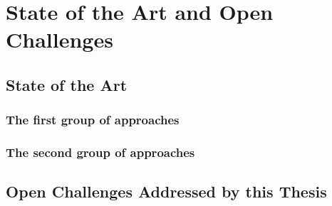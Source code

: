 
\chapter{State of the Art and Open Challenges}

\section{State of the Art}

\blindtext


\subsection*{The first group of approaches}
\label{subsec_FirstGroupRelated}
\blindtext
\cite{AspectJ}

\subsection*{The second group of approaches}
\label{subsec_SecondGroupRelated}
\blindtext
\cite{Hoorn2009,Hoorn2012,rohr2008}

\section{Open Challenges Addressed by this Thesis}

\blindtext


